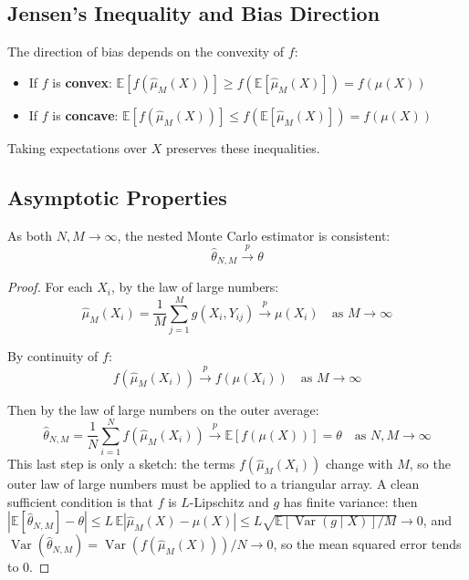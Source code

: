 \begin{notechapter}
\subsection{Jensen's Inequality and Bias Direction}

The direction of bias depends on the convexity of $f$:

\begin{itemize}
\item If $f$ is \textbf{convex}: $\mathbb{E}[f(\hat{\mu}_M(X))] \geq f(\mathbb{E}[\hat{\mu}_M(X)]) = f(\mu(X))$
\item If $f$ is \textbf{concave}: $\mathbb{E}[f(\hat{\mu}_M(X))] \leq f(\mathbb{E}[\hat{\mu}_M(X)]) = f(\mu(X))$
\end{itemize}

Taking expectations over $X$ preserves these inequalities.

\subsection{Asymptotic Properties}

\begin{theorem}
As both $N, M \to \infty$, the nested Monte Carlo estimator is consistent:
\begin{equation}
\hat{\theta}_{N,M} \xrightarrow{p} \theta
\end{equation}
\end{theorem}

\begin{proof}
For each $X_i$, by the law of large numbers:
\begin{equation}
\hat{\mu}_M(X_i) = \frac{1}{M} \sum_{j=1}^M g(X_i, Y_{ij}) \xrightarrow{p} \mu(X_i) \quad \text{as } M \to \infty
\end{equation}

By continuity of $f$:
\begin{equation}
f(\hat{\mu}_M(X_i)) \xrightarrow{p} f(\mu(X_i)) \quad \text{as } M \to \infty
\end{equation}

Then by the law of large numbers on the outer average:
\begin{equation}
\hat{\theta}_{N,M} = \frac{1}{N} \sum_{i=1}^N f(\hat{\mu}_M(X_i)) \xrightarrow{p} \mathbb{E}[f(\mu(X))] = \theta \quad \text{as } N, M \to \infty
\end{equation}
This last step is only a sketch: the terms $f(\hat{\mu}_M(X_i))$ change with $M$, so the outer law
of large numbers must be applied to a triangular array. A clean sufficient condition is that $f$ is
$L$-Lipschitz and $g$ has finite variance: then
$|\mathbb{E}[\hat{\theta}_{N,M}] - \theta| \leq L\,\mathbb{E}|\hat{\mu}_M(X) - \mu(X)| \leq L\sqrt{\mathbb{E}[\operatorname{Var}(g\mid X)]/M} \to 0$,
and $\operatorname{Var}(\hat{\theta}_{N,M}) = \operatorname{Var}(f(\hat{\mu}_M(X)))/N \to 0$, so the mean squared
error tends to $0$.
\end{proof}


\end{notechapter}
